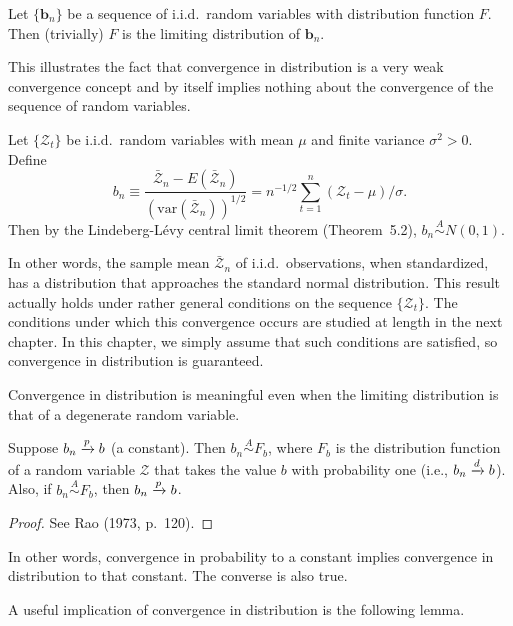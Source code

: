 \begin{example}\label{ex:4.2}
Let $\{\mathbf{b}_n\}$ be a sequence of i.i.d.\ random variables with distribution function $F$. Then (trivially) $F$ is the limiting distribution of $\mathbf{b}_n$.
\end{example}

This illustrates the fact that convergence in distribution is a very weak
convergence concept and by itself implies nothing about the convergence
of the sequence of random variables.

\begin{example}\label{ex:4.3}
Let $\{\mathcal{Z}_t\}$ be i.i.d.\ random variables with mean $\mu$ and finite variance $\sigma^2 > 0$. Define
\[
b_n \equiv \frac{\bar{\mathcal{Z}}_n - E(\bar{\mathcal{Z}}_n)}{(\mathrm{var}(\bar{\mathcal{Z}}_n))^{1/2}} = n^{-1/2} \sum_{t=1}^{n} (\mathcal{Z}_t - \mu)/\sigma.
\]
Then by the Lindeberg-L\'evy central limit theorem (Theorem~5.2), $b_n \overset{A}{\sim} N(0,1)$.
\end{example}

In other words, the sample mean $\bar{\mathcal{Z}}_n$ of i.i.d.\ observations, when standardized, has a distribution that approaches the standard normal distribution.
This result actually holds under rather general conditions on the sequence
$\{\mathcal{Z}_t\}$. The conditions under which this convergence occurs are studied at
length in the next chapter. In this chapter, we simply assume that such
conditions are satisfied, so convergence in distribution is guaranteed.

Convergence in distribution is meaningful even when the limiting distribution is that of a degenerate random variable.

\begin{lemma}\label{lem:4.4}
Suppose $b_n \xrightarrow{p} b$ (a constant). Then $b_n \overset{A}{\sim} F_b$, where $F_b$ is the distribution function of a random variable $\mathcal{Z}$ that takes the value $b$ with probability one (i.e., $b_n \xrightarrow{d} b$). Also, if $b_n \overset{A}{\sim} F_b$, then $b_n \xrightarrow{p} b$.
\end{lemma}

\begin{proof}
See Rao (1973, p.~120).
\end{proof}

In other words, convergence in probability to a constant implies convergence
in distribution to that constant. The converse is also true.

A useful implication of convergence in distribution is the following lemma.

